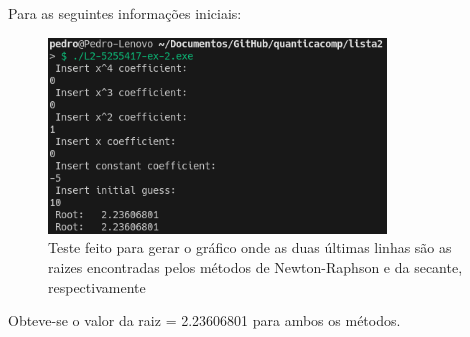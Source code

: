 \documentclass[12pt, a4paper]{article} %
\begin{document}
            Para as seguintes informa\c{c}\~oes iniciais:
            \begin{figure}[H]
                \centering
                \includegraphics[width=0.8\textwidth]{../images/results-ex-2-10.png}
                \caption{Teste feito para gerar o gr\'afico onde as duas \'ultimas linhas s\~ao as raizes encontradas pelos m\'etodos de Newton-Raphson e da secante, respectivamente}
            \end{figure}
            Obteve-se o valor da raiz = 2.23606801 para ambos os m\'etodos.
\end{document}
